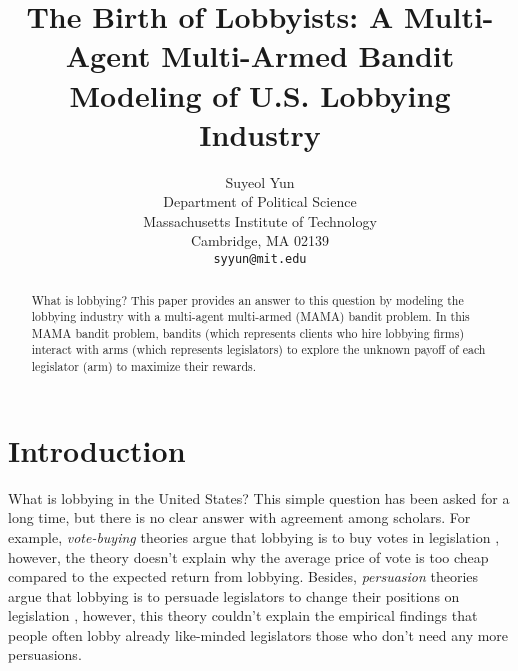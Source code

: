 \documentclass{article}
\title{The Birth of Lobbyists: A Multi-Agent Multi-Armed Bandit Modeling of U.S. Lobbying Industry}
\author{%
Suyeol Yun
\\
Department of Political Science\\
Massachusetts Institute of Technology\\
Cambridge, MA 02139 \\
\texttt{syyun@mit.edu} \\
}
\begin{document}
\maketitle
\begin{abstract}
What is lobbying? This paper provides an answer to this question by modeling the lobbying industry with a multi-agent multi-armed (MAMA) bandit problem.
In this MAMA bandit problem, bandits (which represents clients who hire lobbying firms) interact with arms (which represents legislators) to explore the unknown payoff of each legislator (arm) to maximize their rewards.



\end{abstract}
\section{Introduction}
What is lobbying in the United States? This simple question has been asked for a long time, but there is no clear answer with agreement among scholars.
For example, \textit{vote-buying} theories argue that lobbying is to buy votes in legislation \citep{grossman}, however, the theory doesn't explain why the average price of vote is too cheap compared to the expected return from lobbying.
Besides, \textit{persuasion} theories argue that lobbying is to persuade legislators to change their positions on legislation \citep{truman, Bauer2017, milbrath1984washington}, however, this theory couldn't explain the empirical findings that people often lobby already like-minded legislators those who don't need any more persuasions.

\end{document}
